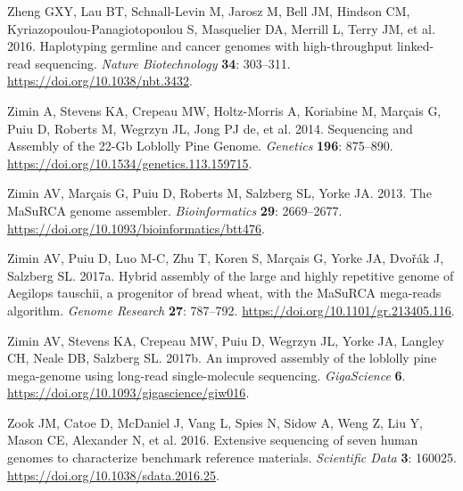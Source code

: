 \documentclass[
  12pt,
  oneside,
  openany]{book}
\begin{document}
\leavevmode\hypertarget{ref-Zheng_2016}{}%
Zheng GXY, Lau BT, Schnall-Levin M, Jarosz M, Bell JM, Hindson CM, Kyriazopoulou-Panagiotopoulou S, Masquelier DA, Merrill L, Terry JM, et al. 2016. Haplotyping germline and cancer genomes with high-throughput linked-read sequencing. \emph{Nature Biotechnology} \textbf{34}: 303--311. \url{https://doi.org/10.1038/nbt.3432}.

\leavevmode\hypertarget{ref-Zimin_2014}{}%
Zimin A, Stevens KA, Crepeau MW, Holtz-Morris A, Koriabine M, Marçais G, Puiu D, Roberts M, Wegrzyn JL, Jong PJ de, et al. 2014. Sequencing and Assembly of the 22-Gb Loblolly Pine Genome. \emph{Genetics} \textbf{196}: 875--890. \url{https://doi.org/10.1534/genetics.113.159715}.

\leavevmode\hypertarget{ref-Zimin_2013}{}%
Zimin AV, Marçais G, Puiu D, Roberts M, Salzberg SL, Yorke JA. 2013. The MaSuRCA genome assembler. \emph{Bioinformatics} \textbf{29}: 2669--2677. \url{https://doi.org/10.1093/bioinformatics/btt476}.

\leavevmode\hypertarget{ref-Zimin_2017_MaSuRCA}{}%
Zimin AV, Puiu D, Luo M-C, Zhu T, Koren S, Marçais G, Yorke JA, Dvořák J, Salzberg SL. 2017a. Hybrid assembly of the large and highly repetitive genome of Aegilops tauschii, a progenitor of bread wheat, with the MaSuRCA mega-reads algorithm. \emph{Genome Research} \textbf{27}: 787--792. \url{https://doi.org/10.1101/gr.213405.116}.

\leavevmode\hypertarget{ref-Zimin_2017}{}%
Zimin AV, Stevens KA, Crepeau MW, Puiu D, Wegrzyn JL, Yorke JA, Langley CH, Neale DB, Salzberg SL. 2017b. An improved assembly of the loblolly pine mega-genome using long-read single-molecule sequencing. \emph{GigaScience} \textbf{6}. \url{https://doi.org/10.1093/gigascience/giw016}.

\leavevmode\hypertarget{ref-Zook_2016}{}%
Zook JM, Catoe D, McDaniel J, Vang L, Spies N, Sidow A, Weng Z, Liu Y, Mason CE, Alexander N, et al. 2016. Extensive sequencing of seven human genomes to characterize benchmark reference materials. \emph{Scientific Data} \textbf{3}: 160025. \url{https://doi.org/10.1038/sdata.2016.25}.
\end{document}
